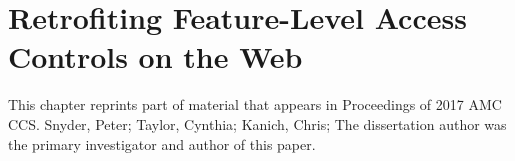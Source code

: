\chapter{Retrofiting Feature-Level Access Controls on the Web}
\label{current-web}

This chapter reprints part of material that appears in
Proceedings of 2017 AMC CCS. Snyder, Peter; Taylor,
Cynthia; Kanich, Chris; The dissertation author was the primary investigator and
author of this paper.





